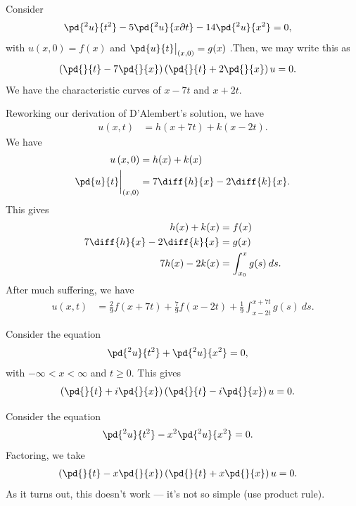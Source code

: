 \documentclass[10pt]{mypackage}
\begin{document}
\begin{example}
  Consider
  \begin{align*}
    \pd{^2u}{t^2} - 5 \pd{^2u}{x\partial t} - 14 \pd{^2u}{x^2} &= 0,
  \end{align*}
  with $u\left( x,0 \right) = f(x)$ and $\pd{u}{t}\bigr\vert_{(x,0)} = g(x)$ .Then, we may write this as
  \begin{align*}
    \left( \pd{}{t} - 7 \pd{}{x} \right) \left( \pd{}{t} + 2 \pd{}{x} \right) u &= 0.
  \end{align*}
  We have the characteristic curves of $x-7t$ and $x + 2t$.\newline

  Reworking our derivation of D'Alembert's solution, we have
  \begin{align*}
    u\left( x,t \right) &= h\left( x + 7t \right) + k\left( x-2t \right).
  \end{align*}
  We have
  \begin{align*}
    u\left( x,0 \right) &= h(x) + k(x)\\
    \pd{u}{t}\biggr\vert_{(x,0)} &= 7\diff{h}{x} - 2 \diff{k}{x}.
  \end{align*}
  This gives
  \begin{align*}
    h(x) + k(x) &= f(x)\\
    7 \diff{h}{x} - 2 \diff{k}{x} &= g(x)\\
    7h(x) -2k(x) &= \int_{x_0}^{x} g(s)\:ds.
  \end{align*}
  After much suffering, we have
  \begin{align*}
    u\left( x,t \right) &= \frac{2}{9}f\left( x + 7t \right) + \frac{7}{9}f\left( x-2t \right) + \frac{1}{9} \int_{x-2t}^{x+7t} g(s)\:ds.
  \end{align*}
\end{example}
\begin{example}
  Consider the equation
  \begin{align*}
    \pd{^2u}{t^2} + \pd{^2u}{x^2} &= 0,
  \end{align*}
  with $-\infty < x < \infty$ and $t\geq 0$. This gives
  \begin{align*}
    \left( \pd{}{t} + i \pd{}{x} \right) \left( \pd{}{t} - i \pd{}{x} \right) u &= 0.
  \end{align*}
\end{example}
\begin{example}
  Consider the equation
  \begin{align*}
    \pd{^2u}{t^2} - x^2 \pd{^2u}{x^2} &= 0.
  \end{align*}
  Factoring, we take
  \begin{align*}
    \left( \pd{}{t} - x\pd{}{x} \right) \left( \pd{}{t} + x \pd{}{x} \right) u &= 0.
  \end{align*}
  As it turns out, this doesn't work --- it's not so simple (use product rule).
\end{example}
\end{document}
